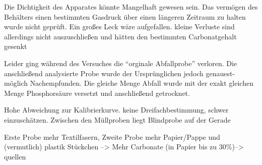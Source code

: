 Die Dichtigkeit des Apparates könnte Mangelhaft gewesen sein. Das vermögen des Behälters einen bestimmten Gasdruck über einen längeren Zeitraum zu halten wurde nicht geprüft. Ein großes Leck wäre aufgefallen. kleine Verluste sind allerdings nicht auszuschließen und hätten den bestimmten Carbonatgehalt gesenkt 

Leider ging während des Versuches die "`orginale Abfallprobe"' verloren. Die anschließend analysierte Probe wurde der Ursprünglichen jedoch genauest-möglich Nachempfunden. Die gleiche Menge Abfall wurde mit der exakt gleichen Menge Phosphorsäure versetzt und anschließend getrocknet.

Hohe Abweichung zur Kalibrierkurve. keine Dreifachbestimmung, schwer einzuschätzen. Zwischen den Müllproben liegt Blindprobe auf der Gerade

Erste Probe mehr Textilfasern, Zweite Probe mehr Papier/Pappe und (vermutlich) plastik Stückchen --> Mehr Carbonate (in Papier bis zu 30\%)--> quellen


